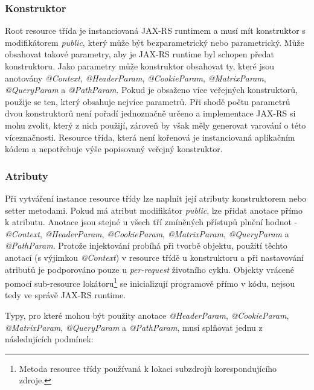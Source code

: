 \documentclass[11pt,twoside,a4paper]{book}
\begin{document}
\subsubsection{Konstruktor}

Root resource třída je instanciovaná JAX-RS runtimem a musí mít konstruktor s
modifikátorem {\em public}, který může být bezparametrický nebo parametrický.
Může obsahovat takové parametry, aby je JAX-RS runtime byl schopen předat konstruktoru. Jako parametry
může konstruktor obsahovat ty, které jsou anotovány {\em @Context}, {\em @HeaderParam},
{\em @CookieParam}, {\em @MatrixParam}, {\em @QueryParam} a {\em @PathParam}. Pokud je obsaženo více
veřejných konstruktorů, použije se ten, který obsahuje nejvíce parametrů. Při
shodě počtu parametrů dvou konstruktorů není pořadí jednoznačně určeno a implementace JAX-RS si
mohu zvolit, který z nich použijí, zároveň by však měly generovat varování o této
víceznačnosti. Resource třída, která není kořenová je instanciovaná aplikačním
kódem a nepotřebuje výše popisovaný veřejný konstruktor.

\subsubsection{Atributy}
\label{ch:atributy}

Při vytváření instance resource třídy lze naplnit její atributy konstruktorem nebo setter
metodami. Pokud má atribut modifikátor {\em public}, lze přidat anotace přímo k
atributu. Anotace jsou stejné u všech tří zmíněných přístupů plnění hodnot - {\em @Context}, {\em @HeaderParam},
{\em @CookieParam}, {\em @MatrixParam}, {\em @QueryParam} a {\em @PathParam}. Protože injektování probíhá
při tvorbě objektu, použití těchto anotací (s výjimkou {\em @Context}) v resource třídě u
konstruktoru a při nastavování atributů je podporováno pouze u {\em per-request}
životního cyklu. Objekty vrácené pomocí sub-resource lokátoru\footnote{Metoda
resource třídy používaná k lokaci subzdrojů korespondujícího zdroje.} se
inicializují programově přímo v kódu, nejsou tedy ve správě JAX-RS runtime.

Typy, pro které mohou být použity anotace {\em @HeaderParam}, {\em @CookieParam}, {\em @MatrixParam},
{\em @QueryParam} a {\em @PathParam}, musí splňovat jednu z následujících podmínek:
\end{document}
